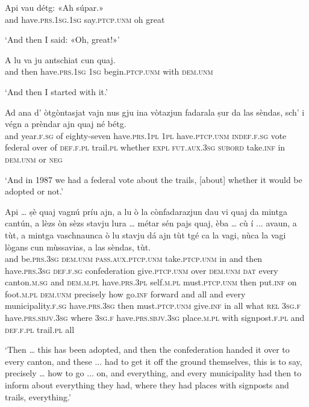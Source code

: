 \begin{linenumbers}
\gll Api vau détg: «Ah súpar.»\\
and have.\textsc{prs.1sg.1sg} say.\textsc{ptcp.unm} oh great\\
\end{linenumbers}
\medskip
\glt `And then I said: «Oh, great!»'
\medskip

\begin{linenumbers}
\gll  A lu va ju antschiat cun quaj.  \\
and then have.\textsc{prs.1sg} \textsc{1sg} begin.\textsc{ptcp.unm} with \textsc{dem.unm}\\
\end{linenumbers}
\medskip
\glt `And then I started with it.'
\medskip

\begin{linenumbers}
\gll Ad ana d' òtgòntasjat vajn nus gju ina vòtazjun fadarala ṣur da las sèndas, sch' i végn a prèndar ajn quaj né bétg.   \\
and year.\textsc{f.sg} of eighty-seven have.\textsc{prs.1pl} \textsc{1pl} have.\textsc{ptcp.unm} \textsc{indef.f.sg} vote federal over of \textsc{def.f.pl} trail.\textsc{pl} whether \textsc{expl} \textsc{fut.aux.3sg} \textsc{subord} take.\textsc{inf} in \textsc{dem.unm} or \textsc{neg}  \\
\end{linenumbers}
\medskip
\glt `And in 1987 we had a federal vote about the trails, [about] whether it would be adopted or not.'
\medskip

\begin{linenumbers}
\gll Api … ṣè quaj vagnú príu ajn, a lu ò la cònfadarazjun dau vi quaj da mintga cantún, a lèzs òn sèzs stavju lura … métar sén pajs quaj, èba … cù í ... avaun, a tùt, a mintga vaschnaunca ò lu stavju dá ajn tùt tgé ca la vagi, nùca la vagi lògans cun mùssavias, a las sèndas, tùt.   \\
and {} be.\textsc{prs.3sg} \textsc{dem.unm} \textsc{pass.aux.ptcp.unm} take.\textsc{ptcp.unm} in and then have.\textsc{prs.3sg} \textsc{def.f.sg} confederation give.\textsc{ptcp.unm} over \textsc{dem.unm} \textsc{dat} every canton.\textsc{m.sg} and \textsc{dem.m.pl} have.\textsc{prs.3pl} self.\textsc{m.pl} must.\textsc{ptcp.unm} then {} put.\textsc{inf} on foot.\textsc{m.pl} \textsc{dem.unm} precisely {} how go.\textsc{inf} {} forward and all and every municipality.\textsc{f.sg} have.\textsc{prs.3sg} then must.\textsc{ptcp.unm} give.\textsc{inf} in all what \textsc{rel} \textsc{3sg.f} have.\textsc{prs.sbjv.3sg} where \textsc{3sg.f} have.\textsc{prs.sbjv.3sg} place.\textsc{m.pl} with signpost.\textsc{f.pl} and \textsc{def.f.pl} trail.\textsc{pl} all \\
\end{linenumbers}
\medskip
\glt `Then … this has been adopted, and then the confederation handed it over to every canton, and these ... had to get it off the ground themselves, this is to say, precisely … how to go ... on, and everything, and every municipality had then to inform about everything they had, where they had places with signposts and trails, everything.'
\medskip

